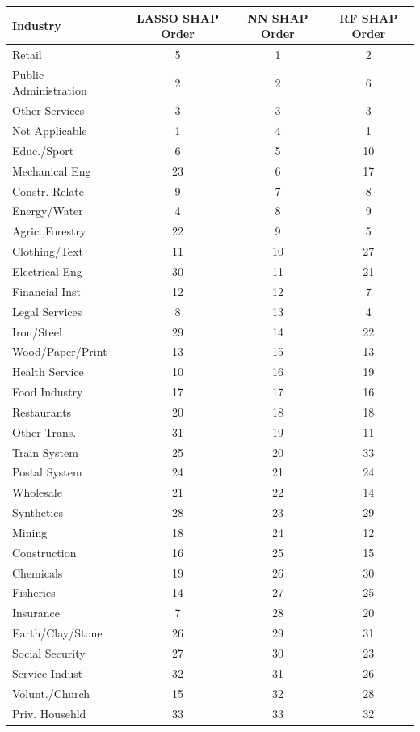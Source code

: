 \begin{tabular}{lccc}
\hline\hline
Industry & LASSO SHAP Order & NN SHAP Order & RF SHAP Order \\
\hline
Retail&5&1&2\\
Public Administration&2&2&6\\
Other Services&3&3&3\\
Not Applicable&1&4&1\\
Educ./Sport&6&5&10\\
Mechanical Eng&23&6&17\\
Constr. Relate&9&7&8\\
Energy/Water&4&8&9\\
Agric.,Forestry&22&9&5\\
Clothing/Text&11&10&27\\
Electrical Eng&30&11&21\\
Financial Inst&12&12&7\\
Legal Services&8&13&4\\
Iron/Steel&29&14&22\\
Wood/Paper/Print&13&15&13\\
Health Service&10&16&19\\
Food Industry&17&17&16\\
Restaurants&20&18&18\\
Other Trans.&31&19&11\\
Train System&25&20&33\\
Postal System&24&21&24\\
Wholesale&21&22&14\\
Synthetics&28&23&29\\
Mining&18&24&12\\
Construction&16&25&15\\
Chemicals&19&26&30\\
Fisheries&14&27&25\\
Insurance&7&28&20\\
Earth/Clay/Stone&26&29&31\\
Social Security&27&30&23\\
Service Indust&32&31&26\\
Volunt./Church&15&32&28\\
Priv. Househld&33&33&32\\
\hline\hline
\end{tabular}
